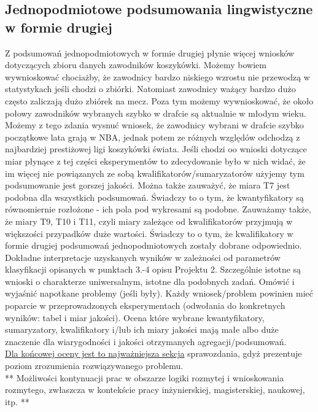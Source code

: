 \documentclass{classrep}
\begin{document}
\subsection{Jednopodmiotowe podsumowania lingwistyczne w formie drugiej}
Z podsumowań jednopodmiotowych w formie drugiej płynie więcej wniosków dotyczących zbioru danych zawodników koszykówki. Możemy bowiem wywnioskować chociażby, że zawodnicy bardzo niskiego wzrostu nie przewodzą w statystykach jeśli chodzi o zbiórki. Natomiast zawodnicy ważący bardzo dużo często zaliczają dużo zbiórek na mecz. Poza tym możemy wywnioskować, że około połowy zawodników wybranych szybko w drafcie są aktualnie w młodym wieku. Możemy z tego zdania wysnuć wniosek, że zawodnicy wybrani w drafcie szybko początkowe lata grają w NBA, jednak potem ze różnych względów odchodzą z najbardziej prestiżowej ligi koszykówki świata. Jeśli chodzi oo wnioski dotyczące miar płynące z tej części eksperymentów to zdecydowanie było w nich widać, że im więcej nie powiązanych ze sobą kwalifikatorów/sumaryzatorów użyjemy tym podsumowanie jest gorszej jakości. Można także zauważyć, że miara T7 jest podobna dla wszystkich podsumowań. Świadczy to o tym, że kwantyfikatory są równomiernie rozłożone - ich pola pod wykresami są podobne. Zauważamy także, że miary T9, T10 i T11, czyli miary zależące od kwalifikatorów przyjmują w większości przypadków duże wartości. Świadczy to o tym, że kwalifikatory w formie drugiej podsumowań jednopodmiotowych zostały dobrane odpowiednio.\\

Dokładne interpretacje uzyskanych wyników w zależności od parametrów klasyfikacji
opisanych w punktach 3.-4 opisu Projektu 2. 
Szczególnie istotne są wnioski o charakterze uniwersalnym, istotne dla podobnych zadań. 
Omówić i wyjaśnić napotkane problemy (jeśli były). Każdy wniosek/problem powinien mieć poparcie
w przeprowadzonych eksperymentach (odwołania do konkretnych wyników: tabel i miar
jakości). Ocena które wybrane kwantyfikatory, sumaryzatory, kwalifikatory i/lub ich
miary jakości mają małe albo duże znaczenie dla wiarygodności i jakości otrzymanych
agregacji/podsumowań.  \\
\underline{Dla końcowej oceny jest to najważniejsza sekcja} sprawozdania, gdyż prezentuje poziom
zrozumienia rozwiązywanego problemu.\\

** Możliwości kontynuacji prac w obszarze logiki rozmytej i wnioskowania rozmytego, zwłaszcza w kontekście pracy inżynierskiej,
magisterskiej, naukowej, itp. **\\
\end{document}
